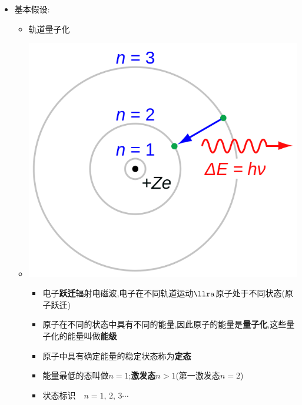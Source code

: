 \documentclass{article}
\begin{document}
\begin{itemize}
\begin{center}
          \end{center}
    \item 基本假设:
          \begin{itemize}
              \item[] 轨道量子化
              \item[]
                  \begin{minipage}{0.4\textwidth}
                      \includegraphics[width = \textwidth]{./pictures/18.png}
                  \end{minipage}
                  \hfill\hspace{-3em}
                  \begin{minipage}{0.52\textwidth}
                      \begin{itemize}
                          \item 电子\textbf{跃迁}辐射电磁波,电子在不同轨道运动$\llra$原子处于不同状态(原子跃迁)
                          \item 原子在不同的状态中具有不同的能量,因此原子的能量是\textbf{量子化},这些量子化的能量叫做\textbf{能级}
                          \item 原子中具有确定能量的稳定状态称为\textbf{定态}
                          \item 能量最低的态叫做$ n = 1 $;\textbf{激发态}$ n > 1 $(第一激发态$ n = 2 $)
                          \item[]
                              $\text{状态标识} \quad n = 1, \, 2, \, 3 \cdots$


\end{itemize}
\end{minipage}
\end{itemize}
\end{itemize}
\end{document}

